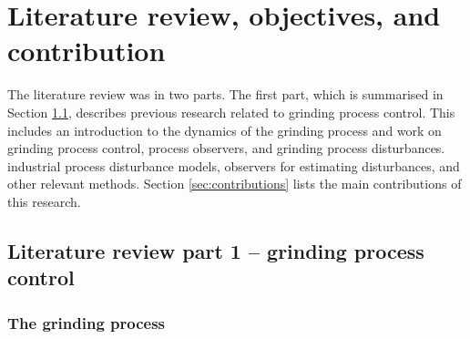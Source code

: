 \chapter{Literature review, objectives, and contribution}
\label{chap-lit-review}

The literature review was in two parts. The first part, which is summarised in Section \ref{sec:lit-grinding}, describes previous research related to grinding process control. This includes an introduction to the dynamics of the grinding process and work on grinding process control, process observers, and grinding process disturbances.  industrial process disturbance models, observers for estimating disturbances, and other relevant methods. Section \ref{sec:contributions} lists the main contributions of this research.

\section{Literature review part 1 – grinding process control} \label{sec:lit-grinding}

\subsection{The grinding process}

